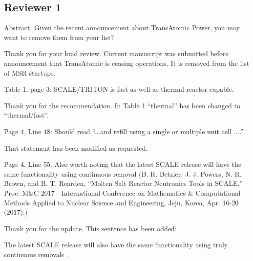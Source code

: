 \documentclass[answers,11pt]{exam}
\begin{document}
\begin{questions}
        \section*{Reviewer 1}

        \question  Abstract: Given the recent announcement about TransAtomic 
        Power, you may want to remove them from your list?
        \begin{solution}
        		Thank you for your kind review. Current manuscript was submitted before 
		        announcement that TransAtomic is ceasing operations. It is removed from 
		        the list of MSR startups.
        \end{solution}

        \question  Table 1, page 3: SCALE/TRITON is fast as well as thermal 
        reactor capable.  
        \begin{solution}
		        Thank you for the recommendation. In Table 1 ``thermal'' has been changed 
		        to ``thermal/fast''.
        \end{solution}

        \question  Page 4, Line 48: Should read ``...and refill using a single 
        or multiple unit cell ....''
        \begin{solution}
        		That statement has been modified as requested.
        \end{solution}

        \question  Page 4, Line 55. Also worth noting that the latest SCALE 
        release will have the same functionality using continuous removal (B. 
        R. Betzler, J. J. Powers, N. R. Brown, and B. T. Rearden, ``Molten Salt 
        Reactor Neutronics Tools in SCALE,'' Proc. M\&C 2017 - International 
        Conference on Mathematics \& Computational Methods Applied to Nuclear 
        Science and Engineering, Jeju, Korea, Apr. 16-20 (2017).)
        \begin{solution}
		        Thank you for the update. This sentence has been added:
        
		        The latest SCALE release will also have the same functionality using 
        		truly continuous removals \cite{betzler_implementation_2017}.
        \end{solution}


\end{questions}
\end{document}
